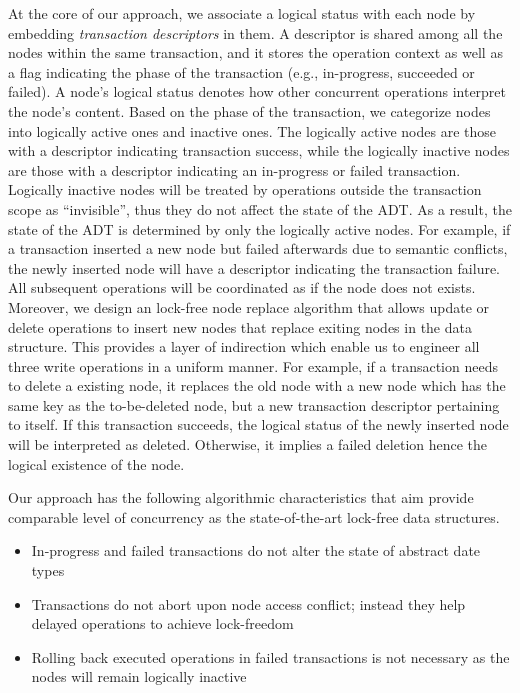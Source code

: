 \documentclass[10pt,conference,compsocconf]{IEEEtran}
\begin{document}
At the core of our approach, we associate a logical status with each node by embedding \emph{transaction descriptors} in them.
A descriptor is shared among all the nodes within the same transaction, and it stores the operation context as well as a flag indicating the phase of the transaction (e.g., in-progress, succeeded or failed).
A node's logical status denotes how other concurrent operations interpret the node's content.
Based on the phase of the transaction, we categorize nodes into logically active ones and inactive ones.
The logically active nodes are those with a descriptor indicating transaction success, while the logically inactive nodes are those with a descriptor indicating an in-progress or failed transaction.
Logically inactive nodes will be treated by operations outside the transaction scope as ``invisible'', thus they do not affect the state of the ADT. 
As a result, the state of the ADT is determined by only the logically active nodes.
For example, if a transaction inserted a new node but failed afterwards due to semantic conflicts, the newly inserted node will have a descriptor indicating the transaction failure.
All subsequent operations will be coordinated as if the node does not exists.
Moreover, we design an lock-free node replace algorithm that allows update or delete operations to insert new nodes that replace exiting nodes in the data structure.
This provides a layer of indirection which enable us to engineer all three write operations in a uniform manner.
For example, if a transaction needs to delete a existing node, it replaces the old node with a new node which has the same key as the to-be-deleted node, but a new transaction descriptor pertaining to itself.
If this transaction succeeds, the logical status of the newly inserted node will be interpreted as deleted. 
Otherwise, it implies a failed deletion hence the logical existence of the node.

Our approach has the following algorithmic characteristics that aim provide comparable level of concurrency as the state-of-the-art lock-free data structures.
\begin{itemize}
    \item In-progress and failed transactions do not alter the state of abstract date types
    \item Transactions do not abort upon node access conflict; instead they help delayed operations to achieve lock-freedom
    \item Rolling back executed operations in failed transactions is not necessary as the nodes will remain logically inactive
\end{itemize}
\end{document}
